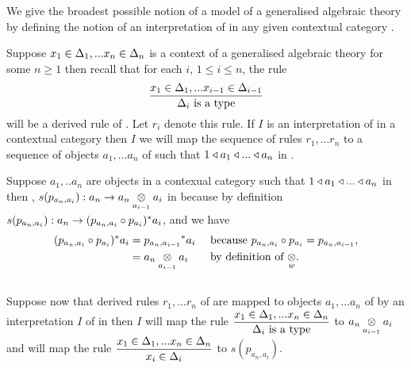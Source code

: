 \note
We give the broadest possible notion of a model
of a generalised algebraic theory \gatUw by defining the notion of an interpretation of  \gatUw in  any given contextual category \catc.

\note
Suppose $x_1 \in \Delta_1,... x_{n} \in \Delta_{n}$ is a context of a generalised algebraic theory \gatU for some $n \ge 1$
then recall that for each $i$, 
$1 \leq i \leq n$, the rule $$\frac{x_1 \in \Delta_1,... x_{i-1} \in \Delta_{i-1}}{\Delta_i\mbox{ is a type}}$$ will be a derived rule of \gatU. Let $r_i$ denote this rule.
If $I$ is an interpretation of \gatUw in a contextual category \catcw then $I$ we will map the sequence of rules
$r_1, ... r_n$ to a sequence of objects $a_1,...a_n$ of \catcw such that
$1 \triangleleft a_1 \triangleleft ... \triangleleft a_n$ in \catc. \\
\renewcommand{\crossx}[3]{#1 \underset{\tiny #3}{\cross} #2}
\begin{minipage}[t]{8.5cm}
\note Suppose $a_1,..a_n$ are objects in a contexual category \catcw such that $1 \triangleleft a_1 \triangleleft ... \triangleleft a_n$ in \catcw then \foreachi,
$s(p_{a_n,a_i}): a_n \morph \crossx{a_n}{a_i}{a_{i-1}}$ in \catcw because by definition  $s(p_{a_n,a_i}): a_n  \rightarrow (p_{a_n,a_i} \circ p_{a_i})^*a_i$,
and we have 
\begin{align*}
(p_{a_n,a_i} \circ p_{a_i})^*a_i &= {p_{a_n,a_{i-1}}} ^* a_i  && \mbox{ because $p_{a_n,a_i} \circ p_{a_i}=p_{a_n,a_{i-1}}$,} \\
                                 &= \crossx{a_n}{a_i}{a_{i-1}} && \mbox{ by definition of $\crossx{}{}{w}$}.
\end{align*} \\
Suppose now that derived rules $r_1,...r_n$ of \gatUw are mapped to objects $a_1, ...a_n$ of \catcw by an interpretation $I$ of \gatU in \catcw then
$I$ will map the rule 
$\displaystyle \frac{x_1 \in \Delta_1,... x_{n} \in \Delta_{n}}{\Delta_i\mbox{ is a type}}$
to $\crossx{a_n}{a_i}{a_{i-1}}$
and will map the rule
$\displaystyle \frac{x_1 \in \Delta_1,... x_{n} \in \Delta_{n}}{x_i \in \Delta_i}$
to $s(p_{a_n,a_i})$.
\end{minipage}
